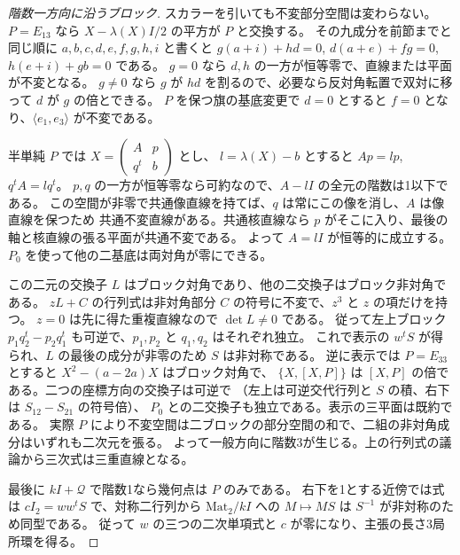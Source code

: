 \begin{proof}[階数一方向に沿うブロック]
スカラーを引いても不変部分空間は変わらない。$P=E_{13}$ なら
$X-\lambda(X)I/2$ の平方が $P$ と交換する。
その九成分を前節までと同じ順に $a,b,c,d,e,f,g,h,i$ と書くと
$g(a+i)+hd=0$, $d(a+e)+fg=0$, $h(e+i)+gb=0$ である。
$g=0$ なら $d,h$ の一方が恒等零で、直線または平面が不変となる。
$g\ne0$ なら $g$ が $hd$ を割るので、必要なら反対角転置で双対に移って $d$ が $g$ の倍とできる。
$P$ を保つ旗の基底変更で $d=0$ とすると $f=0$ となり、$\langle e_1,e_3\rangle$ が不変である。

半単純 $P$ では $X=\left(\begin{smallmatrix}A&p\\q^t&b\end{smallmatrix}\right)$ とし、
$l=\lambda(X)-b$ とすると $A p=l p$, $q^t A=l q^t$。
$p,q$ の一方が恒等零なら可約なので、$A-lI$ の全元の階数は1以下である。
この空間が非零で共通像直線を持てば、$q$ は常にこの像を消し、$A$ は像直線を保つため
共通不変直線がある。共通核直線なら $p$ がそこに入り、最後の軸と核直線の張る平面が共通不変である。
よって $A=lI$ が恒等的に成立する。$P_0$ を使って他の二基底は両対角が零にできる。

この二元の交換子 $L$ はブロック対角であり、他の二交換子はブロック非対角である。
$zL+C$ の行列式は非対角部分 $C$ の符号に不変で、$z^3$ と $z$ の項だけを持つ。
$z=0$ は先に得た重複直線なので $\det L\ne0$ である。
従って左上ブロック $p_1 q_2^t-p_2 q_1^t$ も可逆で、$p_1,p_2$ と $q_1,q_2$ はそれぞれ独立。
これで表示の $w^t S$ が得られ、$L$ の最後の成分が非零のため $S$ は非対称である。
逆に表示では $P=E_{33}$ とすると $X^2-(a-2a)X$ はブロック対角で、
$\{X,[X,P]\}$ は $[X,P]$ の倍である。二つの座標方向の交換子は可逆で
（左上は可逆交代行列と $S$ の積、右下は $S_{12}-S_{21}$ の符号倍）、
$P_0$ との二交換子も独立である。表示の三平面は既約である。
実際 $P$ により不変空間は二ブロックの部分空間の和で、二組の非対角成分はいずれも二次元を張る。
よって一般方向に階数3が生じる。上の行列式の議論から三次式は三重直線となる。

最後に $kI+\mathcal Q$ で階数1なら幾何点は $P$ のみである。
右下を1とする近傍では式は $cI_2=w w^t S$ で、対称二行列から
$\mathrm{Mat}_2/kI$ への $M\mapsto MS$ は $S^{-1}$ が非対称のため同型である。
従って $w$ の三つの二次単項式と $c$ が零になり、主張の長さ3局所環を得る。
\end{proof}

